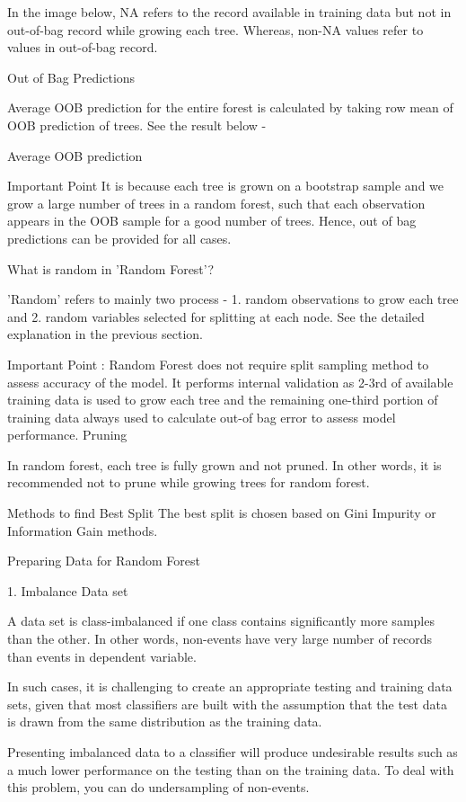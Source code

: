 In the image below, NA refers to the record available in training data but not in out-of-bag record while growing each tree. Whereas, non-NA values refer to values in out-of-bag record.


Out of Bag Predictions

Average OOB prediction for the entire forest is calculated by taking row mean of OOB prediction of trees. See the result below -

Average OOB prediction

Important Point
It is because each tree is grown on a bootstrap sample and we grow a large number of trees in a random forest, such that each observation appears in the OOB sample for a good number of trees. Hence, out of bag predictions can be provided for all cases.

What is random in 'Random Forest'?

'Random' refers to mainly two process - 1. random observations to grow each tree and 2. random variables selected for splitting at each node. See the detailed explanation in the previous section.

Important Point :
Random Forest does not require split sampling method to assess accuracy of the model. It performs internal validation as 2-3rd of available training data is used to grow each tree and the remaining one-third portion of training data always used to calculate out-of bag error to assess model performance.
Pruning

In random forest, each tree is fully grown and not pruned. In other words, it is recommended not to prune while growing trees for random forest.

Methods to find Best Split
The best split is chosen based on Gini Impurity or Information Gain methods.

Preparing Data for Random Forest 

1. Imbalance Data set

A data set is class-imbalanced if one class contains significantly more samples than the other. In other words, non-events have very large number of records than events in dependent variable.

In such cases, it is challenging to create an appropriate testing and training data sets, given that most classifiers are built with the assumption that the test data is drawn from the same distribution as the training data.

Presenting imbalanced data to a classifier will produce undesirable results such as a much lower performance on the testing than on the training data. To deal with this problem, you can do undersampling of non-events.


